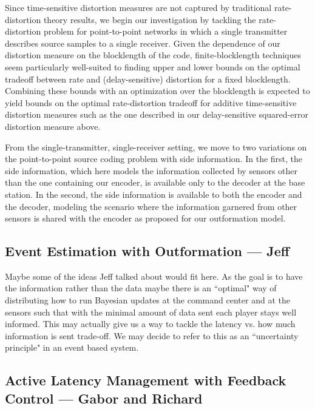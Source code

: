 \documentclass[12pt,letterpaper]{article}
\begin{document}
Since time-sensitive distortion measures are not captured by traditional rate-distortion theory results, we begin our investigation by tackling the rate-distortion problem for point-to-point networks in which a single transmitter describes source samples to a single receiver.  Given the dependence of our distortion measure on the blocklength of the code, finite-blocklength techniques seem particularly well-suited to finding upper and lower bounds on the optimal tradeoff between rate and (delay-sensitive) distortion for a fixed blocklength.  Combining these bounds with an optimization over the blocklength is expected to yield bounds on the optimal rate-distortion tradeoff for additive time-sensitive distortion measures such as the one described in our delay-sensitive squared-error distortion measure above.
 
From the single-transmitter, single-receiver setting, we move to two variations on the point-to-point source coding problem with side information.  In the first, the side information, which here models the information collected by sensors other than the one containing our encoder, is available only to the decoder at the base station.  In the second, the side information is available to both the encoder and the decoder, modeling the scenario where the information garnered from other sensors is shared with the encoder as proposed for our outformation model.


\subsection{Event Estimation with Outformation --- Jeff}

Maybe some of the ideas Jeff talked about would fit here. As the goal is to have the information rather than the data maybe there is an ``optimal" way of distributing how to run Bayesian updates at the command center and at the sensors such that with the minimal amount of data sent each player stays well informed. This may actually give us a way to tackle the latency vs. how much information is sent trade-off. We may decide to refer to this as an ``uncertainty principle" in an event based system.


\subsection{Active Latency Management with Feedback Control --- Gabor and Richard}
\end{document}
